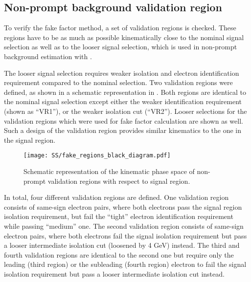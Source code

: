 \subsection{Non-prompt background validation region}
\label{subsec:fake_validation}

To verify the fake factor method, a set of validation regions is checked. 
These regions have to be as much as possible kinematically close to
the nominal signal selection as well as to the looser signal selection, 
which is used in non-prompt background estimation with .

The looser signal selection requires weaker isolation and
electron identification requirement compared to the nominal selection.
Two validation regions were defined, as shown in a schematic representation in . 
Both regions are identical to the nominal signal selection 
except either the weaker identification requirement (shown as ``VR1''), or 
the weaker isolation cut (``VR2'').
Looser selections for the
validation regions which were used for fake factor calculation are shown
as well. Such a design of the validation region provides similar kinematics to the one in the signal region.

\begin{figure}[h]
\begin{center}
\texttt{[image: SS/fake\_regions\_black\_diagram.pdf]}
\caption{Schematic representation of the kinematic phase space of non-prompt validation regions with respect to signal region.}
\label{fig:fake_validation_regions}
\end{center}
\end{figure}

In total, four different validation regions are defined.
One validation region consists of same-sign electron pairs, where both electrons pass the signal region isolation requirement, 
but fail the ``tight'' electron identification requirement while passing ``medium'' one.
The second validation region consists of same-sign electron pairs, where both electrons fail the signal isolation requirement
but pass a looser intermediate isolation cut (loosened by 4 GeV) instead.
The third and fourth validation regions are identical to the second one but require only the leading (third region) or the subleading (fourth region)
electron to fail the signal isolation requirement but pass a looser intermediate isolation cut instead.

